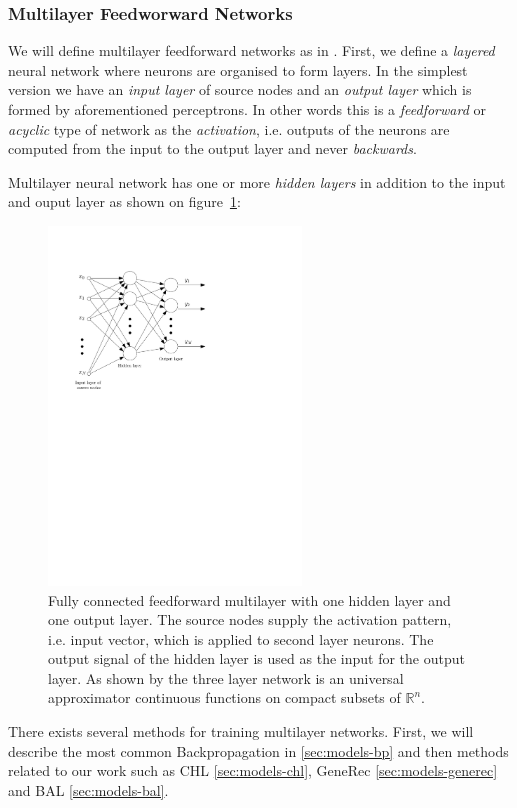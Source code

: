 \subsubsection{Multilayer Feedworward Networks} 
\label{sec:theory-multilayer} 

We will define multilayer feedforward networks as in \citet{haykin1994neural}. First, we define a \emph{layered} neural network where neurons are organised to form layers. In the simplest version we have an \emph{input layer} of source nodes and an \emph{output layer} which is formed by aforementioned perceptrons. In other words this is a \emph{feedforward} or \emph{acyclic} type of network as the \emph{activation}, i.e. outputs of the neurons are computed from the input to the output layer and never \emph{backwards}. 

Multilayer neural network has one or more \emph{hidden layers} in addition to the input and ouput layer as shown on figure~\ref{fig:multilayer}: 

\begin{figure}[H]
  \centering
  \includegraphics[width=0.6\textwidth]{img/multilayer.pdf}    
  \caption{Fully connected feedforward multilayer with one hidden layer and one output layer. The source nodes supply the activation pattern, i.e. input vector, which is applied to second layer neurons. The output signal of the hidden layer is used as the input for the output layer. As shown by \citet{cybenko1989approximation} the three layer network is an universal approximator continuous functions on compact subsets of $\mathbb{R}^n$.} 
  \label{fig:multilayer}
\end{figure}

There exists several methods for training multilayer networks. First, we will describe the most common Backpropagation in \ref{sec:models-bp} and then methods related to our work such as CHL \ref{sec:models-chl}, GeneRec \ref{sec:models-generec} and BAL \ref{sec:models-bal}. 
